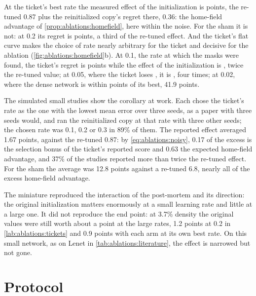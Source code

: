 \begin{refsection}
At the ticket's best rate the measured effect of the initialization is  points, the re-tuned 0.87 plus the reinitialized copy's regret there, 0.36: the home-field advantage of \cref{prop:ablations:homefield}, here within the noise. For the sham it is not: at 0.2 its regret is  points, a third of the re-tuned effect. And the ticket's flat curve makes the choice of rate nearly arbitrary for the ticket and decisive for the ablation (\cref{fig:ablations:homefield}b). At 0.1, the rate at which the masks were found, the ticket's regret is  points while the effect of the initialization is , twice the re-tuned value; at 0.05, where the ticket loses , it is , four times; at 0.02, where the dense network is within  points of its best, 41.9 points.

The simulated small studies show the corollary at work. Each chose the ticket's rate as the one with the lowest mean error over three seeds, as a paper with three seeds would, and ran the reinitialized copy at that rate with three other seeds; the chosen rate was 0.1, 0.2 or 0.3 in 89\% of them. The reported effect averaged 1.67 points, against the re-tuned 0.87: by \eqref{eq:ablations:noisy}, 0.17 of the excess is the selection bonus of the ticket's reported score and 0.63 the expected home-field advantage, and 37\% of the studies reported more than twice the re-tuned effect. For the sham the average was 12.8 points against a re-tuned 6.8, nearly all of the excess home-field advantage.

The miniature reproduced the interaction of the post-mortem and its direction: the original initialization matters enormously at a small learning rate and little at a large one. It did not reproduce the end point: at 3.7\% density the original values were still worth about a point at the large rates, 1.2 points at 0.2 in \cref{lab:ablations:tickets} and 0.9 points with each arm at its own best rate. On this small network, as on Lenet in \cref{tab:ablations:literature}, the effect is narrowed but not gone.

\section{Protocol}\label{sec:ablations:protocol}


\end{refsection}
